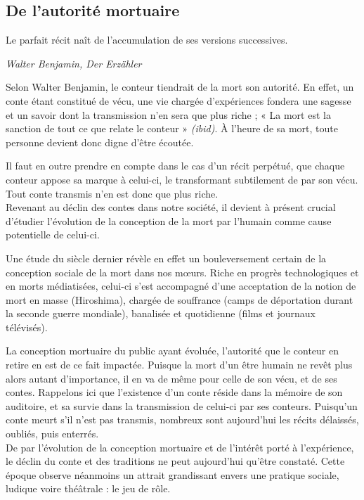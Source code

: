 \subsection{De l'autorité mortuaire}

\begin{shadequote}
Le parfait récit naît de l'accumulation de ses versions successives. \par\emph{Walter Benjamin, Der Erzähler}
\end{shadequote}

Selon Walter Benjamin, le conteur tiendrait de la mort son autorité. En effet, un conte étant constitué de vécu, une vie chargée d'expériences fondera une sagesse et un savoir dont la transmission n'en sera que plus riche ; « La mort est la sanction de tout ce que relate le conteur » \textit{(ibid)}. À l'heure de sa mort, toute personne devient donc digne d'être écoutée.

Il faut en outre prendre en compte dans le cas d'un récit perpétué, que chaque conteur appose sa marque à celui-ci, le transformant subtilement de par son vécu. Tout conte transmis n'en est donc que plus riche.\\


Revenant au déclin des contes dans notre société, il devient à présent crucial d'étudier l'évolution de la conception de la mort par l'humain comme cause potentielle de celui-ci.

Une étude du siècle dernier révèle en effet un bouleversement certain de la conception sociale de la mort dans nos m\oe urs. Riche en progrès technologiques et en morts médiatisées, celui-ci s'est accompagné d'une acceptation de la notion de mort en masse (Hiroshima), chargée de souffrance (camps de déportation durant la seconde guerre mondiale), banalisée et quotidienne (films et journaux télévisés).

La conception mortuaire du public ayant évoluée, l'autorité que le conteur en retire en est de ce fait impactée. Puisque la mort d'un être humain ne revêt plus alors autant d'importance, il en va de même pour celle de son vécu, et de ses contes. Rappelons ici que l'existence d'un conte réside dans la mémoire de son auditoire, et sa survie dans la transmission de celui-ci par ses conteurs. Puisqu'un conte meurt s'il n'est pas transmis, nombreux sont aujourd'hui les récits délaissés, oubliés, puis enterrés.\\

De par l'évolution de la conception mortuaire et de l'intérêt porté à l'expérience, le déclin du conte et des traditions ne peut aujourd'hui qu'être constaté. Cette époque observe néanmoins un attrait grandissant envers une pratique sociale, ludique voire théâtrale : le jeu de rôle.

\clearpage
